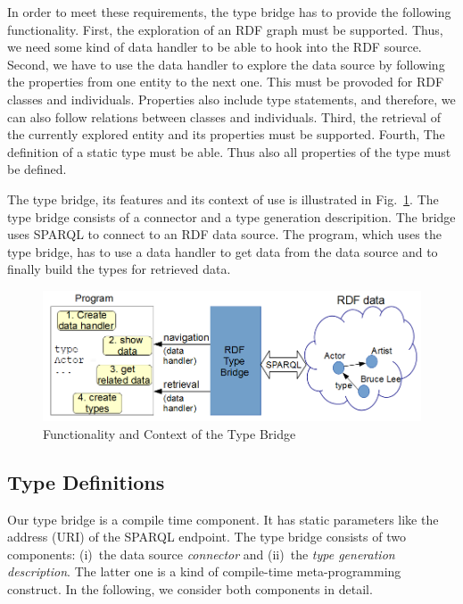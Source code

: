 \documentclass{llncs} %
\begin{document}
In order to meet these requirements, the type bridge has to provide the following functionality.
First, the exploration of an RDF graph must be supported. Thus, we need some kind of data handler
to be able to hook into the RDF source. Second, we have to use the data handler to explore the data source by
following the properties from one entity to the next one. This must be provoded for RDF classes and individuals.
Properties also include type statements, and therefore,
we can also follow relations between classes and individuals.
Third, the retrieval of the currently explored entity and its properties must be supported.
Fourth, The definition of a static type must be able. Thus also all properties of
the type must be defined.

The type bridge, its features and its context of use is illustrated in Fig.~\ref{fig:context}.
The type bridge consists of a connector and a type  generation descripition. The bridge uses
SPARQL to connect to an RDF data source. The program, which uses the type bridge, has to use
a data handler to get data from the data source and to finally build the types for retrieved data.
\begin{figure}
	\centering
		\includegraphics[width=0.98\linewidth]{./figs/context.png}
	\caption{Functionality and Context of the Type Bridge}
	\label{fig:context}
\end{figure}



\subsection{Type Definitions}

Our type bridge is a compile time component. It has static parameters like
the address (URI) of the SPARQL endpoint.
The type bridge consists of two components: (i)~the data source \emph{connector} and (ii)~the
\emph{type generation description}. The latter one is a kind of compile-time meta-programming construct.
In the following, we consider both components in detail.
\end{document}
